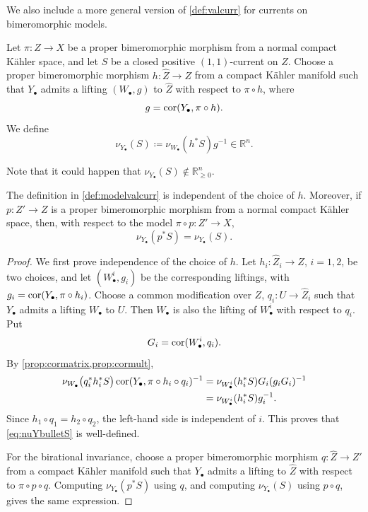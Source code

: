 We also include a more general version of \cref{def:valcurr} for currents on bimeromorphic models.
\begin{definition}\label{def:modelvalcurr}
    Let $\pi\colon Z\rightarrow X$ be a proper bimeromorphic morphism from a normal compact Kähler space, and let $S$ be a closed positive $(1,1)$-current on $Z$. Choose a proper bimeromorphic morphism
    $h\colon \widehat Z\rightarrow Z$ from a compact Kähler manifold such that
    $Y_{\bullet}$ admits a lifting $(W_{\bullet},g)$ to $\widehat Z$ with
    respect to $\pi\circ h$, where
    \[
        g=\operatorname{cor}(Y_{\bullet},\pi\circ h).
    \]
    We define
    \begin{equation}\label{eq:nuYbulletS}
        \nu_{Y_{\bullet}}(S)\coloneqq \nu_{W_{\bullet}}(h^*S)g^{-1}\in \mathbb{R}^n.
    \end{equation}
\end{definition}
Note that it could happen that $\nu_{Y_{\bullet}}(S)\notin \mathbb{R}_{\geq 0}^n$.

\begin{lemma}\label{lma:modelvalcurrbir}
    The definition in \cref{def:modelvalcurr} is independent of the choice of $h$. Moreover, if $p\colon Z'\rightarrow Z$ is a proper bimeromorphic morphism from a normal compact Kähler space, then, with respect to the model $\pi\circ p\colon Z'\rightarrow X$,
    \[
        \nu_{Y_{\bullet}}(p^*S)=\nu_{Y_{\bullet}}(S).
    \]
\end{lemma}
\begin{proof}
    We first prove independence of the choice of $h$. Let $h_i\colon \widehat Z_i\rightarrow Z$, $i=1,2$, be two choices, and let $(W^i_{\bullet},g_i)$ be the corresponding liftings, with $g_i=\operatorname{cor}(Y_{\bullet},\pi\circ h_i)$. Choose a common modification over $Z$, $q_i\colon U\rightarrow \widehat Z_i$ such that $Y_{\bullet}$ admits a lifting $W_{\bullet}$ to $U$. Then $W_{\bullet}$ is also the lifting of $W^i_{\bullet}$ with respect to $q_i$. Put
    \[
        G_i=\operatorname{cor}(W^i_{\bullet},q_i).
    \]
    By \cref{prop:cormatrix,prop:cormult},
    \[
    \begin{aligned}
        \nu_{W_{\bullet}}\bigl(q_i^*h_i^*S\bigr)
        \operatorname{cor}(Y_{\bullet},\pi\circ h_i\circ q_i)^{-1}
        &=
        \nu_{W^i_{\bullet}}(h_i^*S)G_i(g_iG_i)^{-1}  \\
        &=
        \nu_{W^i_{\bullet}}(h_i^*S)g_i^{-1}.
    \end{aligned}
    \]
    Since $h_1\circ q_1=h_2\circ q_2$, the left-hand side is independent of $i$. This proves that \eqref{eq:nuYbulletS} is well-defined.

    For the birational invariance, choose a proper bimeromorphic morphism $q\colon \widehat Z\rightarrow Z'$ from a compact Kähler manifold such that $Y_{\bullet}$ admits a lifting to $\widehat Z$ with respect to $\pi\circ p\circ q$. Computing $\nu_{Y_{\bullet}}(p^*S)$ using $q$, and computing $\nu_{Y_{\bullet}}(S)$ using $p\circ q$, gives the same expression.
\end{proof}

